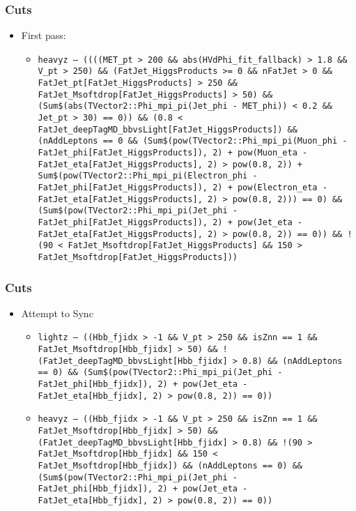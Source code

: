 \documentclass{beamer}
\begin{document}
\begin{frame}
  \frametitle{Cuts}

  \begin{itemize}
  \item First pass:
    \begin{itemize}
    \item \texttt{\scriptsize heavyz -- ((((MET\_pt > 200 \&\& abs(HVdPhi\_fit\_fallback) > 1.8 \&\& V\_pt > 250) \&\& (FatJet\_HiggsProducts >= 0 \&\& nFatJet > 0 \&\& FatJet\_pt[FatJet\_HiggsProducts] > 250 \&\& FatJet\_Msoftdrop[FatJet\_HiggsProducts] > 50) \&\& (Sum\$(abs(TVector2::Phi\_mpi\_pi(Jet\_phi - MET\_phi)) < 0.2 \&\& Jet\_pt > 30) == 0)) \&\& (0.8 < FatJet\_deepTagMD\_bbvsLight[FatJet\_HiggsProducts]) \&\& (nAddLeptons == 0 \&\& (Sum\$(pow(TVector2::Phi\_mpi\_pi(Muon\_phi - FatJet\_phi[FatJet\_HiggsProducts]), 2) + pow(Muon\_eta - FatJet\_eta[FatJet\_HiggsProducts], 2) > pow(0.8, 2)) + Sum\$(pow(TVector2::Phi\_mpi\_pi(Electron\_phi - FatJet\_phi[FatJet\_HiggsProducts]), 2) + pow(Electron\_eta - FatJet\_eta[FatJet\_HiggsProducts], 2) > pow(0.8, 2))) == 0) \&\& (Sum\$(pow(TVector2::Phi\_mpi\_pi(Jet\_phi - FatJet\_phi[FatJet\_HiggsProducts]), 2) + pow(Jet\_eta - FatJet\_eta[FatJet\_HiggsProducts], 2) > pow(0.8, 2)) == 0)) \&\& !(90 < FatJet\_Msoftdrop[FatJet\_HiggsProducts] \&\& 150 > FatJet\_Msoftdrop[FatJet\_HiggsProducts]))}
    \end{itemize}
  \end{itemize}

\end{frame}

\begin{frame}
  \frametitle{Cuts}

  \begin{itemize}
  \item Attempt to Sync
    \begin{itemize}
    \item \texttt{\scriptsize lightz -- ((Hbb\_fjidx > -1 \&\& V\_pt > 250 \&\& isZnn == 1 \&\& FatJet\_Msoftdrop[Hbb\_fjidx] > 50) \&\& !(FatJet\_deepTagMD\_bbvsLight[Hbb\_fjidx] > 0.8) \&\& (nAddLeptons == 0) \&\& (Sum\$(pow(TVector2::Phi\_mpi\_pi(Jet\_phi - FatJet\_phi[Hbb\_fjidx]), 2) + pow(Jet\_eta - FatJet\_eta[Hbb\_fjidx], 2) > pow(0.8, 2)) == 0))}
    \item \texttt{\scriptsize heavyz -- ((Hbb\_fjidx > -1 \&\& V\_pt > 250 \&\& isZnn == 1 \&\& FatJet\_Msoftdrop[Hbb\_fjidx] > 50) \&\& (FatJet\_deepTagMD\_bbvsLight[Hbb\_fjidx] > 0.8) \&\& !(90 > FatJet\_Msoftdrop[Hbb\_fjidx] \&\& 150 < FatJet\_Msoftdrop[Hbb\_fjidx]) \&\& (nAddLeptons == 0) \&\& (Sum\$(pow(TVector2::Phi\_mpi\_pi(Jet\_phi - FatJet\_phi[Hbb\_fjidx]), 2) + pow(Jet\_eta - FatJet\_eta[Hbb\_fjidx], 2) > pow(0.8, 2)) == 0))}
    \end{itemize}
  \end{itemize}

\end{frame}
\end{document}
